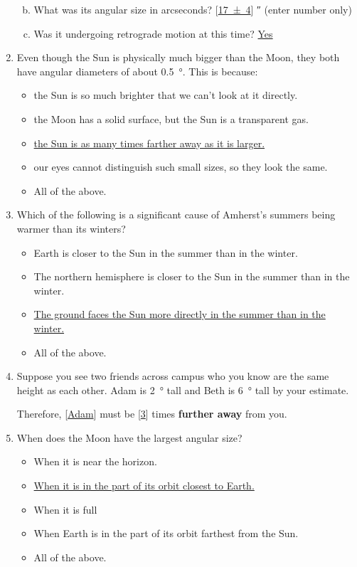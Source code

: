 \documentclass[12pt]{article}
\begin{document}
\begin{enumerate}
\begin{enumerate}[a.]
\begin{itemize}
    \end{itemize}
    \item What was its angular size in arcseconds? [\underline{\num{17(4)}}] \si{\arcsecond} (enter number only)
    \item Was it undergoing retrograde motion at this time? \underline{Yes}
\end{enumerate}
\item
Even though the Sun is physically much bigger than the Moon, they both have angular diameters of about \SI{0.5}{\degree}. This is because:
\begin{itemize}
    \item the Sun is so much brighter that we can’t look at it directly.
    \item the Moon has a solid surface, but the Sun is a transparent gas.
    \item \underline{the Sun is as many times farther away as it is larger.}
    \item our eyes cannot distinguish such small sizes, so they look the same.
    \item All of the above.
\end{itemize}
\item
Which of the following is a significant cause of Amherst’s summers being warmer than its winters?
\begin{itemize}
    \item Earth is closer to the Sun in the summer than in the winter.
    \item The northern hemisphere is closer to the Sun in the summer than in the winter.
    \item \underline{The ground faces the Sun more directly in the summer than in the winter.}
    \item All of the above.
\end{itemize}
\item
Suppose you see two friends across campus who you know are the same height as each other. Adam is \SI{2}{\degree} tall and Beth is \SI{6}{\degree} tall by your estimate.

Therefore, [\underline{Adam}] must be [\underline{3}] times \textbf{further away} from you.
\item
When does the Moon have the largest angular size?
\begin{itemize}
    \item When it is near the horizon.
    \item \underline{When it is in the part of its orbit closest to Earth.}
    \item When it is full
    \item When Earth is in the part of its orbit farthest from the Sun.
    \item All of the above.
\end{itemize}
\end{enumerate}
\end{document}
